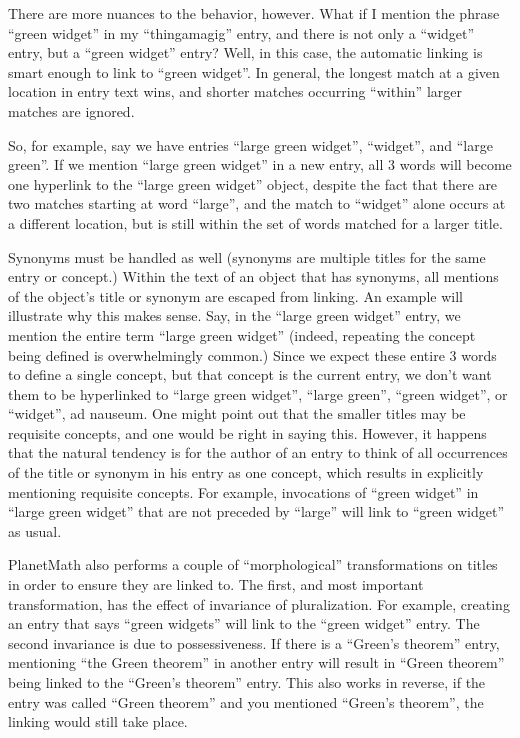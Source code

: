 There are more nuances to the behavior, however. What if I mention the phrase ``green widget'' in my ``thingamagig'' entry, and there is not only a ``widget'' entry, but a ``green widget'' entry? Well, in this case, the automatic linking is smart enough to link to ``green widget''. In general, the longest match at a given location in entry text wins, and shorter matches occurring ``within'' larger matches are ignored.

So, for example, say we have entries ``large green widget'', ``widget'', and ``large green''. If we mention ``large green widget'' in a new entry, all 3 words will become one hyperlink to the ``large green widget'' object, despite the fact that there are two matches starting at word ``large'', and the match to ``widget'' alone occurs at a different location, but is still within the set of words matched for a larger title.

Synonyms must be handled as well (synonyms are multiple titles for the same entry or concept.) Within the text of an object that has synonyms, all mentions of the object's title or synonym are escaped from linking. An example will illustrate why this makes sense. Say, in the ``large green widget'' entry, we mention the entire term ``large green widget'' (indeed, repeating the concept being defined is overwhelmingly common.) Since we expect these entire 3 words to define a single concept, but that concept is the current entry, we don't want them to be hyperlinked to ``large green widget'', ``large green'', ``green widget'', or ``widget'', ad nauseum. One might point out that the smaller titles may be requisite concepts, and one would be right in saying this. However, it happens that the natural tendency is for the author of an entry to think of all occurrences of the title or synonym in his entry as one concept, which results in explicitly mentioning requisite concepts. For example, invocations of ``green widget'' in ``large green widget'' that are not preceded by ``large'' will link to ``green widget'' as usual.

PlanetMath also performs a couple of ``morphological'' transformations on titles in order to ensure they are linked to. The first, and most important transformation, has the effect of invariance of pluralization. For example, creating an entry that says ``green widgets'' will link to the ``green widget'' entry. The second invariance is due to possessiveness. If there is a ``Green's theorem'' entry, mentioning ``the Green theorem'' in another entry will result in ``Green theorem'' being linked to the ``Green's theorem'' entry. This also works in reverse, if the entry was called ``Green theorem'' and you mentioned ``Green's theorem'', the linking would still take place.

